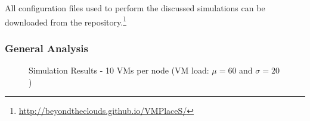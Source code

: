 All configuration files used to perform the discussed simulations can
be downloaded from the \vmps repository.\footnote{\url{http://beyondtheclouds.github.io/VMPlaceS/}}

\subsubsection{General  Analysis}
\label{subsec:general-comparison}

\begin{figure}[bp]
\vspace*{-.3cm}
\subcapcentertrue
{}
\caption{Simulation Results - 10 VMs per node (VM load: $\mu=60$ and $\sigma=20$)}
\label{fig:simulation-overview}
\vspace*{-.3cm}
\end{figure}



